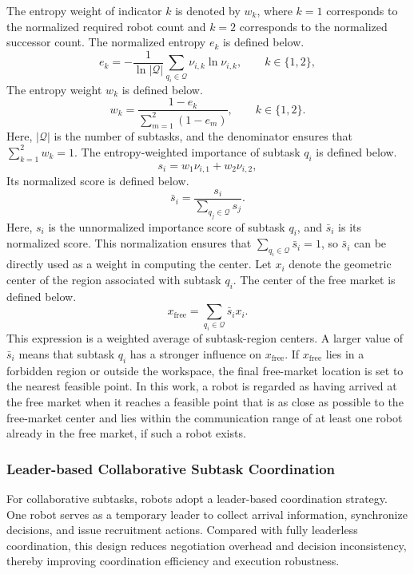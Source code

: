 \documentclass[lettersize,journal]{IEEEtran}
\begin{document}
The entropy weight of indicator $k$ is denoted by $w_k$, where $k=1$ corresponds to the normalized required robot count and $k=2$ corresponds to the normalized successor count. The normalized entropy $e_k$ is defined below.
\begin{equation}
e_k = -\frac{1}{\ln |\mathcal{Q}|}
\sum_{q_i \in \mathcal{Q}} \nu_{i,k} \ln \nu_{i,k},
\qquad k \in \{1,2\},
\end{equation}
The entropy weight $w_k$ is defined below.
\begin{equation}
w_k = \frac{1 - e_k}{\sum_{m=1}^{2} (1 - e_m)},
\qquad k \in \{1,2\}.
\end{equation}
Here, $|\mathcal{Q}|$ is the number of subtasks, and the denominator ensures that $\sum_{k=1}^{2} w_k = 1$.
The entropy-weighted importance of subtask $q_i$ is defined below.
\begin{equation}
s_i = w_1 \nu_{i,1} + w_2 \nu_{i,2},
\end{equation}
Its normalized score is defined below.
\begin{equation}
\bar{s}_i = \frac{s_i}{\sum_{q_j \in \mathcal{Q}} s_j}.
\end{equation}
Here, $s_i$ is the unnormalized importance score of subtask $q_i$, and $\bar{s}_i$ is its normalized score. This normalization ensures that $\sum_{q_i \in \mathcal{Q}} \bar{s}_i = 1$, so $\bar{s}_i$ can be directly used as a weight in computing the center. Let $x_i$ denote the geometric center of the region associated with subtask $q_i$. The center of the free market is defined below.
\begin{equation}
x_{\mathrm{free}} = \sum_{q_i \in \mathcal{Q}} \bar{s}_i x_i.
\end{equation}
This expression is a weighted average of subtask-region centers. A larger value of $\bar{s}_i$ means that subtask $q_i$ has a stronger influence on $x_{\mathrm{free}}$. If $x_{\mathrm{free}}$ lies in a forbidden region or outside the workspace, the final free-market location is set to the nearest feasible point. In this work, a robot is regarded as having arrived at the free market when it reaches a feasible point that is as close as possible to the free-market center and lies within the communication range of at least one robot already in the free market, if such a robot exists.
\subsubsection{Leader-based Collaborative Subtask Coordination}\label{coor}
For collaborative subtasks, robots adopt a leader-based coordination strategy. One robot serves as a temporary leader to collect arrival information, synchronize decisions, and issue recruitment actions. Compared with fully leaderless coordination, this design reduces negotiation overhead and decision inconsistency, thereby improving coordination efficiency and execution robustness.
\end{document}
